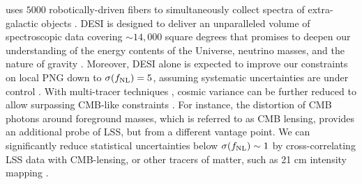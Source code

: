    uses $5000$ robotically-driven fibers to simultaneously collect spectra of extra-galactic objects \citep{2013arXiv1308.0847L, 2016arXiv161100037D, 2023AJ....165....9S}. DESI is designed to deliver an unparalleled volume of spectroscopic data covering $\sim 14,000$ square degrees that promises to deepen our understanding of the energy contents of the Universe, neutrino masses, and the nature of gravity \citep{2022AJ....164..207D}. Moreover, DESI alone is expected to improve our constraints on local PNG down to $\sigma(f_{\rm NL})=5$, assuming systematic uncertainties are under control \citep{aghamousa2016desi}. With multi-tracer techniques \citep{PhysRevLett.102.021302}, cosmic variance can be further reduced to allow surpassing CMB-like constraints \citep{2015ApJ...814..145A}. For instance, the distortion of CMB photons around foreground masses, which is referred to as CMB lensing, provides an additional probe of LSS, but from a different vantage point. We can significantly reduce statistical uncertainties below $\sigma(f_{\rm NL})\sim 1$ by cross-correlating LSS data with CMB-lensing, or other tracers of matter, such as 21 cm intensity mapping  \citep[see, e.g.,][]{schmittfull2018PhRvD, Heinrich2022AAS...24020203H, 2023arXiv230102406J, 2023arXiv230308901S}.  
 

